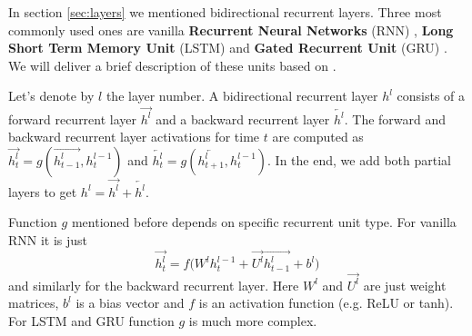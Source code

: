 \documentclass[licencjacka,en]{pracamgr}
\begin{document}
	\lstm
	
	In section \ref{sec:layers} we mentioned bidirectional recurrent layers. Three most commonly used ones are vanilla \textbf{Recurrent Neural Networks} (RNN) \cite{RNN}, \textbf{Long Short Term Memory Unit} (LSTM) \cite{LSTM} and \textbf{Gated Recurrent Unit} (GRU) \cite{GRU}. We will deliver a brief description of these units based on \cite{DS2}.
	
	Let's denote by $l$ the layer number. A bidirectional recurrent layer $h^l$ consists of a forward recurrent layer $\overrightarrow{h^l}$ and a backward recurrent layer $\overleftarrow{h^l}$. The forward and backward recurrent layer activations for time $t$ are computed as $\overrightarrow{h^l_t} = g(\overrightarrow{h^l_{t - 1}}, h^{l-1}_t)$ and $\overleftarrow{h^l_t} = g(\overleftarrow{h^l_{t+1}}, h^{l-1}_t)$. In the end, we add both partial layers to get $h^l = \overrightarrow{h^l} + \overleftarrow{h^l}$.
	
	Function $g$ mentioned before depends on specific recurrent unit type. For vanilla RNN it is just
	$$\overrightarrow{h^l_t} = f\big(W^l h^{l-1}_t + \overrightarrow{U^l} \overrightarrow{h^l_{t - 1}} + b^l\big)$$
	and similarly for the backward recurrent layer. Here $W^l$ and $\overrightarrow{U^l}$ are just weight matrices, $b^l$ is a bias vector and $f$ is an activation function (e.g. ReLU or tanh). For LSTM and GRU function $g$ is much more complex.
	
\end{document}
